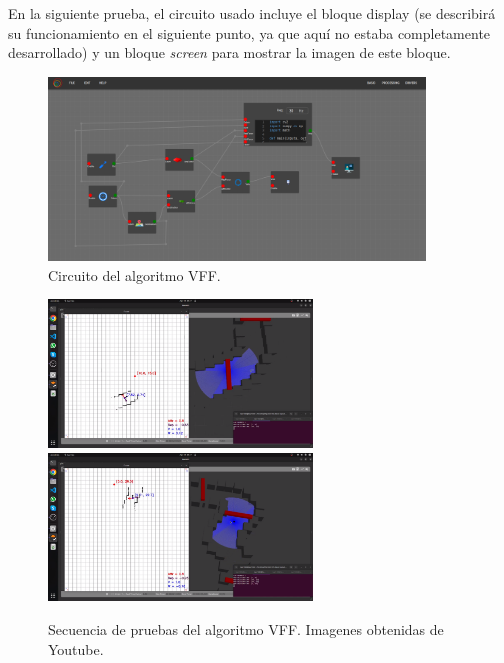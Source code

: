 En la siguiente prueba, el circuito usado incluye el bloque display (se describirá su funcionamiento en el siguiente punto, ya que aquí no estaba completamente
desarrollado) y un bloque \textit{screen} para mostrar la imagen de este bloque.

\begin{figure} [H]
    \begin{center}
        \includegraphics[width=10cm]{figs/c6/VFF_disp_circ.png}
    \end{center}
    \caption[Circuito VFF]{Circuito del algoritmo VFF.}
    \label{fig:VFF_disp_circ}
\end{figure}

\begin{figure} [H]
    \begin{center}
        \includegraphics[width=7cm]{figs/c6/VFF_d1.png}
        \includegraphics[width=7cm]{figs/c6/VFF_d2.png}
    \end{center}
    \caption[Secuencia prueba VFF]{Secuencia de pruebas del algoritmo VFF. Imagenes obtenidas de Youtube\footnotemark.}
    \label{fig:VFF_pruebas}
\end{figure}

